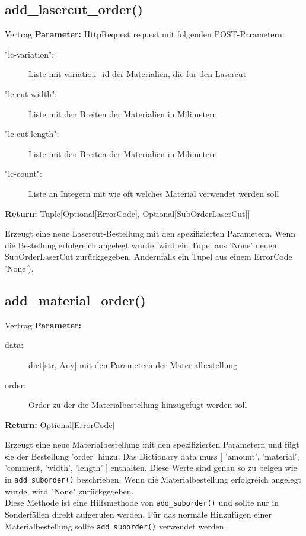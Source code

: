 \documentclass[12pt]{article}
\newcommand{\method}[1]{{\color{violet} \texttt{#1}}}
\newcommand{\insetContract}{12pt}
\newcommand{\insetMethodDescription}{-0.7cm}
\begin{document}
\subsection{add_lasercut_order()}
\begin{contract}{Vertrag}
    \textbf{Parameter:} HttpRequest request mit folgenden POST-Parametern:
    \begin{description}
        \item[\hspace{\insetContract} "lc-variation":] Liste mit variation_id der Materialien, die für den Lasercut
        \item[\hspace{\insetContract} "lc-cut-width":] Liste mit den Breiten der Materialien in Milimetern
        \item[\hspace{\insetContract} "lc-cut-length":] Liste mit den Breiten der Materialien in Milimetern
        \item[\hspace{\insetContract} "lc-count":] Liste an Integern mit wie oft welches Material verwendet werden soll
    \end{description}
    \textbf{Return:} Tuple[Optional[ErrorCode], Optional[SubOrderLaserCut]]
\end{contract}
\hspace{\insetMethodDescription{}}
Erzeugt eine neue Lasercut-Bestellung mit den spezifizierten Parametern. Wenn die Bestellung erfolgreich angelegt wurde, wird ein Tupel aus 'None' neuen SubOrderLaserCut zurückgegeben.
Andernfalls ein Tupel aus einem ErrorCode 'None'). 


\subsection{add_material_order()}
\begin{contract}{Vertrag}
    \textbf{Parameter:} 
    \begin{description}
        \item[\hspace{\insetContract} data:] dict[str, Any] mit den Parametern der Materialbestellung
        \item[\hspace{\insetContract} order:]  Order zu der die Materialbestellung hinzugefügt werden soll
    \end{description}
    \textbf{Return:} Optional[ErrorCode]
\end{contract}
\hspace{\insetMethodDescription{}}
Erzeugt eine neue Materialbestellung mit den spezifizierten Parametern und fügt sie der Bestellung 'order' hinzu. Das Dictionary data muss $[$ 'amount', 'material', 'comment, 'width', 'length' $]$ enthalten.
Diese Werte sind genau so zu belgen wie in \method{add_suborder()} beschrieben. Wenn die Materialbestellung erfolgreich angelegt wurde, wird "None" zurückgegeben. \\
Diese Methode ist eine Hilfsmethode von \method{add_suborder()} und sollte nur in Sonderfällen direkt aufgerufen werden. Für das normale Hinzufügen einer Materialbestellung sollte \method{add_suborder()} verwendet werden.
\end{document}
